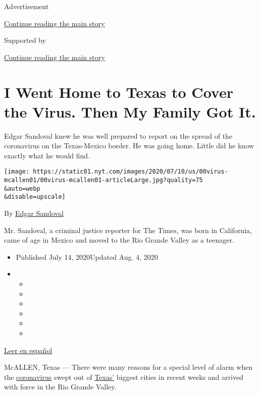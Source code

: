 Advertisement

\protect\hyperlink{after-top}{Continue reading the main story}

Supported by

\protect\hyperlink{after-sponsor}{Continue reading the main story}

\hypertarget{i-went-home-to-texas-to-cover-the-virus-then-my-family-got-it}{%
\section{I Went Home to Texas to Cover the Virus. Then My Family Got
It.}\label{i-went-home-to-texas-to-cover-the-virus-then-my-family-got-it}}

Edgar Sandoval knew he was well prepared to report on the spread of the
coronavirus on the Texas-Mexico border. He was going home. Little did he
know exactly what he would find.

\texttt{[image: https://static01.nyt.com/images/2020/07/10/us/00virus-mcallen01/00virus-mcallen01-articleLarge.jpg?quality=75\\\&auto=webp\\\&disable=upscale]}

By \href{https://www.nytimes.com/by/edgar-sandoval}{Edgar Sandoval}

Mr. Sandoval, a criminal justice reporter for The Times, was born in
California, came of age in Mexico and moved to the Rio Grande Valley as
a teenager.

\begin{itemize}
\item
  Published July 14, 2020Updated Aug. 4, 2020
\item
  \begin{itemize}
  \item
  \item
  \item
  \item
  \item
  \item
  \end{itemize}
\end{itemize}

\href{https://www.nytimes.com/es/2020/07/14/espanol/texas-coronavirus-rio-grande-valley.html}{Leer
en español}

McALLEN, Texas --- There were many reasons for a special level of alarm
when the
\href{https://www.nytimes.com/2020/08/04/us/texas-coronavirus-rio-grande-valley-starr-county.html}{coronavirus}
swept out of
\href{https://www.nytimes.com/2020/08/04/us/texas-coronavirus-rio-grande-valley-starr-county.html}{Texas'}
biggest cities in recent weeks and arrived with force in the Rio Grande
Valley.

